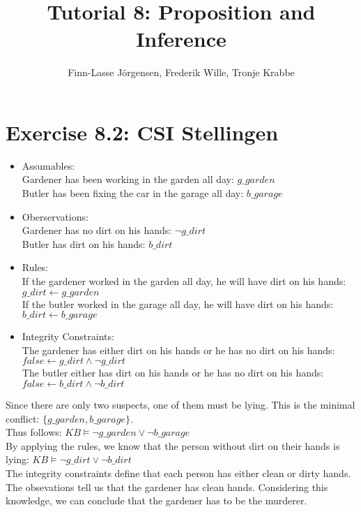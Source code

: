 \documentclass[12pt,a4paper]{article}
\author{Finn-Lasse Jörgensen, Frederik Wille, Tronje Krabbe}
\title{Tutorial 8: Proposition and Inference}
\begin{document}
\maketitle

\section*{Exercise 8.2: CSI Stellingen}
\begin{itemize}
\item Assumables:\\
    Gardener has been working in the garden all day: $ g\_garden $\\
    Butler has been fixing the car in the garage all day: $ b\_garage $\\
\item Oberservations:\\
    Gardener has no dirt on his hands: $ \neg g\_dirt $ \\
    Butler has dirt on his hands: $ b\_dirt $ \\
\item Rules:\\
    If the gardener worked in the garden all day, he will have dirt on
    his hands: $ g\_dirt \leftarrow g\_garden $\\
    If the butler worked in the garage all day, he will have dirt on
    his hands: $ b\_dirt \leftarrow b\_garage $
\item Integrity Constraints:\\
    The gardener has either dirt on his hands or he has no dirt on his
    hands: $ false \leftarrow g\_dirt \land \neg g\_dirt $\\
    The butler either has dirt on his hands or he has no dirt on
    his hands: $ false \leftarrow b\_dirt \land \neg b\_dirt $\\
\end{itemize}
Since there are only two suspects, one of them must be lying.
This is the minimal conflict:
$ \{ g\_garden, b\_garage \} $.\\
Thus follows:
$ KB \models \neg g\_garden \lor \neg b\_garage $\\
By applying the rules, we know that the person without dirt on their hands is lying:
$ KB \models \neg g\_dirt \lor \neg b\_dirt $ \\
The integrity constraints define that each person has either clean or dirty
hands. The obsevations tell us that the gardener has clean hands.
Considering this knowledge, we can conclude that the gardener has to be the murderer.
\end{document}
